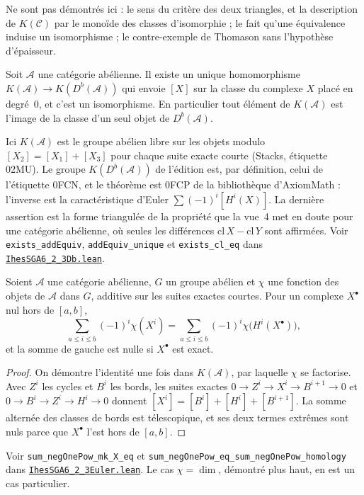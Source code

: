 Ne sont pas démontrés ici : le sens  du critère des deux triangles, et la description de $K(\mathcal C)$ par le monoïde des classes d'isomorphie ; le fait qu'une équivalence induise un isomorphisme ; le contre-exemple de Thomason sans l'hypothèse d'épaisseur.

\begin{enonce}
Soit $\mathcal A$ une catégorie abélienne. Il existe un unique homomorphisme $K(\mathcal A) \to K(D^b(\mathcal A))$ qui envoie $[X]$ sur la classe du complexe $X$ placé en degré~$0$, et c'est un isomorphisme. En particulier tout élément de $K(\mathcal A)$ est l'image de la classe d'un seul objet de $D^b(\mathcal A)$.
\end{enonce}

\noindent Ici $K(\mathcal A)$ est le groupe abélien libre sur les objets modulo $[X_2] = [X_1] + [X_3]$ pour chaque suite exacte courte (Stacks, étiquette 02MU). Le groupe $K(D^b(\mathcal A))$ de l'édition est, par définition, celui de l'étiquette 0FCN, et le théorème est 0FCP de la bibliothèque d'AxiomMath \cite{axiomstacks} : l'inverse est la caractéristique d'Euler $\sum (-1)^i [H^i(X)]$. La dernière assertion est la forme triangulée de la propriété que la vue~4 met en doute pour une catégorie abélienne, où seules les différences $\mathrm{cl}\,X - \mathrm{cl}\,Y$ sont affirmées. Voir \texttt{exists\_addEquiv}, \texttt{addEquiv\_unique} et \texttt{exists\_cl\_eq} dans \href{\leanblobmain/CategoryTheory/IhesSGA6_2_3Db.lean}{\texttt{IhesSGA6\_2\_3Db.\allowbreak{}lean}}.

\begin{enonce}
Soient $\mathcal A$ une catégorie abélienne, $G$ un groupe abélien et $\chi$ une fonction des objets de $\mathcal A$ dans $G$, additive sur les suites exactes courtes. Pour un complexe $X^\bullet$ nul hors de $[a, b]$,
\[\sum_{a \leq i \leq b} (-1)^i \chi(X^i) = \sum_{a \leq i \leq b} (-1)^i \chi\bigl(H^i(X^\bullet)\bigr),\]
et la somme de gauche est nulle si $X^\bullet$ est exact.
\end{enonce}

\begin{proof}
On démontre l'identité une fois dans $K(\mathcal A)$, par laquelle $\chi$ se factorise. Avec $Z^i$ les cycles et $B^i$ les bords, les suites exactes $0 \to Z^i \to X^i \to B^{i+1} \to 0$ et $0 \to B^i \to Z^i \to H^i \to 0$ donnent $[X^i] = [B^i] + [H^i] + [B^{i+1}]$. La somme alternée des classes de bords est télescopique, et ses deux termes extrêmes sont nuls parce que $X^\bullet$ l'est hors de $[a, b]$.
\end{proof}

\begingroup\raggedright
\noindent Voir \texttt{sum\_negOnePow\_mk\_X\_eq} et \texttt{sum\_negOnePow\_eq\_sum\_negOnePow\_homology} dans \href{\leanblobmain/CategoryTheory/IhesSGA6_2_3Euler.lean}{\texttt{IhesSGA6\_2\_3Euler.\allowbreak{}lean}}. Le cas $\chi = \dim$, démontré plus haut, en est un cas particulier.\par\endgroup
